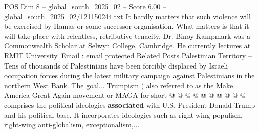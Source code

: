 \begin{textsample}{POS Dim 8 – global\_south\_2025\_02 – Score 6.00 – global\_south\_2025\_02/121150244.txt}
It hardly matters that such violence will be exercised by Hamas or some successor organisation.
What matters is that it will take place with relentless, retributive tenacity.
Dr.
Binoy Kampmark was a Commonwealth Scholar at Selwyn College, Cambridge.
He currently lectures at RMIT University.
Email : email protected Related Posts Palestinian Territory -- Tens of thousands of Palestinians have been forcibly displaced by Israeli occupation forces during the latest military campaign against Palestinians in the northern West Bank.
The goal...
Trumpism ( also referred to as the Make America Great Again movement or MAGA for short @ @ @ @ @ @ @ @ @ @ comprises the political ideologies \textbf{associated} with U.S.
President Donald Trump and his political base.
It incorporates ideologies such as right-wing populism, right-wing anti-globalism, exceptionalism,...

\end{textsample}
